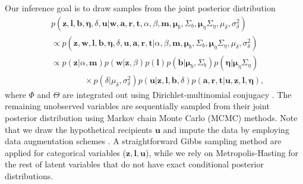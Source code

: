 \documentclass[twoside]{article}
\begin{document}
Our inference goal is to draw samples from the joint posterior distribution
  \begin{equation*}
  \begin{aligned}
  &p(\boldsymbol{z},\boldsymbol{l},\boldsymbol{b}, \boldsymbol{\eta}, \delta,\boldsymbol{u}|\boldsymbol{w}, \boldsymbol{a}, \boldsymbol{r}, \boldsymbol{t}, \alpha, \beta, \boldsymbol{m}, \boldsymbol{\mu}_b, \Sigma_b, \boldsymbol{\mu}_\eta \Sigma_\eta, {\mu}_\delta,\sigma^2_\delta)\\
   &\propto p(\boldsymbol{z},\boldsymbol{w},\boldsymbol{l},\boldsymbol{b}, \boldsymbol{\eta}, \delta,\boldsymbol{u}, \boldsymbol{a}, \boldsymbol{r}, \boldsymbol{t}| \alpha, \beta, \boldsymbol{m}, \boldsymbol{\mu}_b, \Sigma_b, \boldsymbol{\mu}_\eta \Sigma_\eta, {\mu}_\delta,\sigma^2_\delta)\\
  & \propto p(\boldsymbol{z}|\alpha, \boldsymbol{m})p(\boldsymbol{w}|\boldsymbol{z}, \beta)p(\boldsymbol{l})p(\boldsymbol{b}|\boldsymbol{\mu}_b, \Sigma_b)p( \boldsymbol{\eta}|\boldsymbol{\mu}_\eta \Sigma_\eta)\\
  & \quad\quad\quad\quad\times p(\delta| {\mu}_\delta,\sigma^2_\delta)p(\boldsymbol{u}|\boldsymbol{z},\boldsymbol{l}, \boldsymbol{b}, \delta)p(\boldsymbol{a}, \boldsymbol{r}, \boldsymbol{t}|\boldsymbol{u},\boldsymbol{z},\boldsymbol{l}, \boldsymbol{\eta}),
  \end{aligned}
  \label{eqn:jointposterior}
  \end{equation*}
  where $\Phi$ and $\Theta$ are integrated out using Dirichlet-multinomial conjugacy \citep{griffiths2004finding}. The remaining unobserved variables are sequentially sampled from their joint posterior distribution using Markov chain Monte Carlo (MCMC) methods. Note that we draw the hypothetical recipients $\boldsymbol{u}$ and impute the data by employing data augmentation schemes \citep{tanner1987calculation}. A straightforward Gibbs sampling method are applied for categorical variables ($\boldsymbol{z},\boldsymbol{l},\boldsymbol{u}$), while we rely on Metropolis-Hasting for the rest of latent variables that do not have exact conditional posterior distributions.
  
\end{document}
